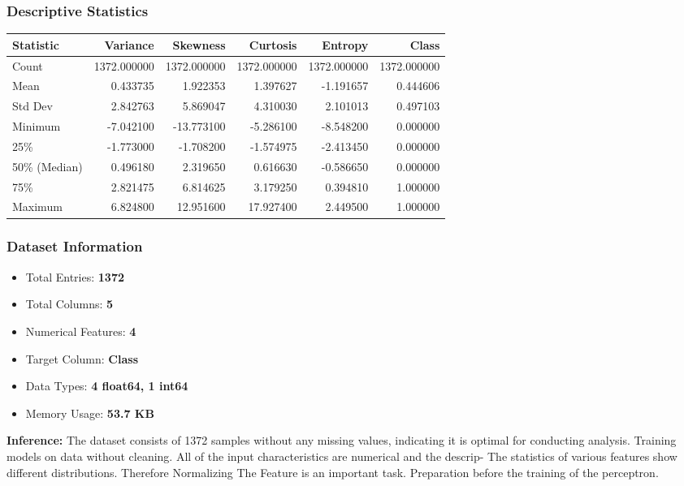 \documentclass[11pt]{article}
\begin{document}
\subsubsection*{Descriptive Statistics}

\begin{center}
\scriptsize
\begin{tabular}{|l|r|r|r|r|r|}
\hline
\textbf{Statistic} & \textbf{Variance} & \textbf{Skewness} & \textbf{Curtosis} & \textbf{Entropy} & \textbf{Class}\\
\hline
Count & 1372.000000 & 1372.000000 & 1372.000000 & 1372.000000 & 1372.000000\\
Mean & 0.433735 & 1.922353 & 1.397627 & -1.191657 & 0.444606\\
Std Dev & 2.842763 & 5.869047 & 4.310030 & 2.101013 & 0.497103\\
Minimum & -7.042100 & -13.773100 & -5.286100 & -8.548200 & 0.000000\\
25\% & -1.773000 & -1.708200 & -1.574975 & -2.413450 & 0.000000\\
50\% (Median) & 0.496180 & 2.319650 & 0.616630 & -0.586650 & 0.000000\\
75\% & 2.821475 & 6.814625 & 3.179250 & 0.394810 & 1.000000\\
Maximum & 6.824800 & 12.951600 & 17.927400 & 2.449500 & 1.000000\\
\hline
\end{tabular}
\end{center}

\subsubsection*{Dataset Information}

\begin{itemize}
    \item Total Entries: \textbf{1372}
    \item Total Columns: \textbf{5}
    \item Numerical Features: \textbf{4}
    \item Target Column: \textbf{Class}
    \item Data Types: \textbf{4 float64, 1 int64}
    \item Memory Usage: \textbf{53.7 KB}
\end{itemize}

\textbf{Inference:} The dataset consists of 1372 samples without any missing values, indicating it is optimal for conducting analysis.
Training models on data without cleaning. All of the input characteristics are numerical and the descrip-
The statistics of various features show different distributions. Therefore Normalizing The Feature is an important task.
Preparation before the training of the perceptron.
\end{document}

